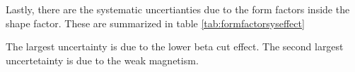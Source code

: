 \documentclass[main.tex]{subfiles}
\begin{document}
Lastly, there are the systematic uncertianties due to the form factors inside the shape factor.
These are summarized in table \ref{tab:formfactorsyseffect}

\begin{table}[!hbt]
	\centering
	\caption{Systematic uncertainties due to nuclear form factors} 
		\label{tab:formfactorsyseffect}
\end{table}

The largest uncertainty is due to the lower beta cut effect.
The second largest uncertetainty is due to the weak magnetism. 
\end{document}
